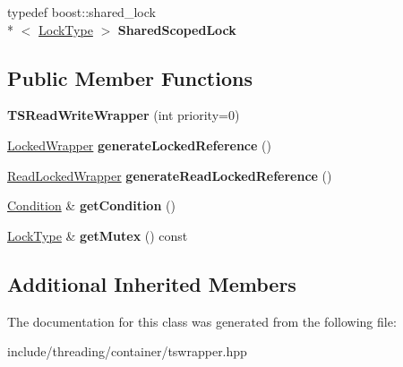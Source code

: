 \begin{DoxyCompactItemize}
\item 
\hypertarget{classcore_1_1threading_1_1container_1_1_t_s_read_write_wrapper_adcd5d8d1ffe88847d4b80eee88deed49}{typedef boost\-::shared\-\_\-lock\\*
$<$ \hyperlink{classcore_1_1threading_1_1_read_write_condition_lock}{Lock\-Type} $>$ {\bfseries Shared\-Scoped\-Lock}}\label{classcore_1_1threading_1_1container_1_1_t_s_read_write_wrapper_adcd5d8d1ffe88847d4b80eee88deed49}

\end{DoxyCompactItemize}
\subsection*{Public Member Functions}
\begin{DoxyCompactItemize}
\item 
\hypertarget{classcore_1_1threading_1_1container_1_1_t_s_read_write_wrapper_a014555d9d1352eb257e1523c1743f88a}{{\bfseries T\-S\-Read\-Write\-Wrapper} (int priority=0)}\label{classcore_1_1threading_1_1container_1_1_t_s_read_write_wrapper_a014555d9d1352eb257e1523c1743f88a}

\item 
\hypertarget{classcore_1_1threading_1_1container_1_1_t_s_read_write_wrapper_a964f4c007d21f22b6b3a3678b97cc2a8}{\hyperlink{classcore_1_1threading_1_1_locked_condition_readable_reference_ptr}{Locked\-Wrapper} {\bfseries generate\-Locked\-Reference} ()}\label{classcore_1_1threading_1_1container_1_1_t_s_read_write_wrapper_a964f4c007d21f22b6b3a3678b97cc2a8}

\item 
\hypertarget{classcore_1_1threading_1_1container_1_1_t_s_read_write_wrapper_ab281cc3c2b095a0f229d55f2fb550245}{\hyperlink{classcore_1_1threading_1_1_read_locked_reference_ptr}{Read\-Locked\-Wrapper} {\bfseries generate\-Read\-Locked\-Reference} ()}\label{classcore_1_1threading_1_1container_1_1_t_s_read_write_wrapper_ab281cc3c2b095a0f229d55f2fb550245}

\item 
\hypertarget{classcore_1_1threading_1_1container_1_1_t_s_read_write_wrapper_a4bccbde803e5cae46294015cc94422ac}{\hyperlink{classcore_1_1threading_1_1_read_write_condition_lock}{Condition} \& {\bfseries get\-Condition} ()}\label{classcore_1_1threading_1_1container_1_1_t_s_read_write_wrapper_a4bccbde803e5cae46294015cc94422ac}

\item 
\hypertarget{classcore_1_1threading_1_1container_1_1_t_s_read_write_wrapper_a3d2b5cc6662a26fa615d336a93926ae5}{\hyperlink{classcore_1_1threading_1_1_read_write_condition_lock}{Lock\-Type} \& {\bfseries get\-Mutex} () const }\label{classcore_1_1threading_1_1container_1_1_t_s_read_write_wrapper_a3d2b5cc6662a26fa615d336a93926ae5}

\end{DoxyCompactItemize}
\subsection*{Additional Inherited Members}


The documentation for this class was generated from the following file\-:\begin{DoxyCompactItemize}
\item 
include/threading/container/tswrapper.\-hpp\end{DoxyCompactItemize}
